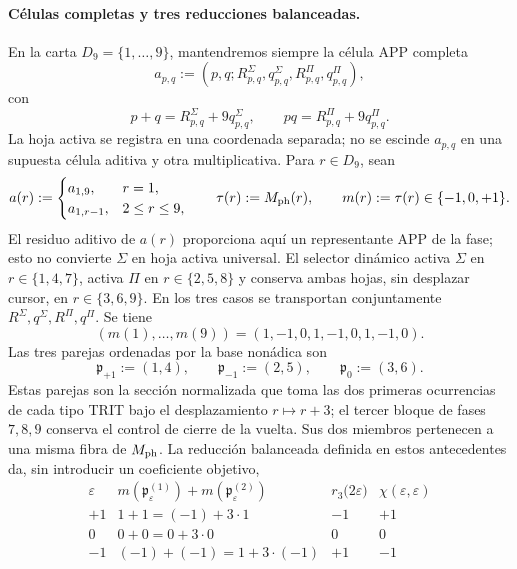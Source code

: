 \paragraph{Células completas y tres reducciones balanceadas.}
En la carta \(D_9=\{1,\ldots,9\}\), mantendremos siempre la célula APP
completa
\[
 a_{p,q}:=(p,q;R^\Sigma_{p,q},q^\Sigma_{p,q},
                 R^\Pi_{p,q},q^\Pi_{p,q}),
\]
con
\[
 p+q=R^\Sigma_{p,q}+9q^\Sigma_{p,q},\qquad
 pq=R^\Pi_{p,q}+9q^\Pi_{p,q}.
\]
La hoja activa se registra en una coordenada separada; no se escinde
\(a_{p,q}\) en una supuesta célula aditiva y otra multiplicativa. Para
\(r\in D_9\), sean
\begin{equation}
 a(r):=
 \begin{cases}
  a_{1,9},&r=1,\\
  a_{1,r-1},&2\le r\le9,
 \end{cases}
 \qquad
 \tau(r):=M_{\rm ph}(r),
 \qquad
 m(r):=\tau(r)\in\{-1,0,+1\}.
 \label{hmtfg:eq:celula-completa-fase-ch}
\end{equation}
El residuo aditivo de \(a(r)\) proporciona aquí un representante APP de la
fase; esto no convierte \(\Sigma\) en hoja activa universal. El selector
dinámico activa \(\Sigma\) en \(r\in\{1,4,7\}\), activa \(\Pi\) en
\(r\in\{2,5,8\}\) y conserva ambas hojas, sin desplazar cursor, en
\(r\in\{3,6,9\}\). En los tres casos se transportan conjuntamente
\(R^\Sigma,q^\Sigma,R^\Pi,q^\Pi\). Se tiene
\[
 (m(1),\ldots,m(9))=(1,-1,0,1,-1,0,1,-1,0).
\]
Las tres parejas ordenadas por la base nonádica son
\begin{equation}
 \mathfrak p_{+1}:=(1,4),\qquad
 \mathfrak p_{-1}:=(2,5),\qquad
 \mathfrak p_{0}:=(3,6).
 \label{hmtfg:eq:tres-pares-internos-ch}
\end{equation}
Estas parejas son la sección normalizada que toma las dos primeras
ocurrencias de cada tipo TRIT bajo el desplazamiento \(r\mapsto r+3\); el
tercer bloque de fases \(7,8,9\) conserva el control de cierre de la vuelta.
Sus dos miembros pertenecen a una misma fibra de \(M_{\rm ph}\). La
reducción balanceada definida en estos antecedentes da, sin introducir un coeficiente
objetivo,
\begin{equation}
 \begin{array}{c|c|c|c}
 \varepsilon&m(\mathfrak p_\varepsilon^{(1)})
                  +m(\mathfrak p_\varepsilon^{(2)})
   &r_3\bigl(2\varepsilon\bigr)&
   \chi(\varepsilon,\varepsilon)\\ \hline
 +1&1+1=(-1)+3\cdot1&-1&+1\\
 0&0+0=0+3\cdot0&0&0\\
 -1&(-1)+(-1)=1+3\cdot(-1)&+1&-1
 \end{array}
 \label{hmtfg:eq:tres-carry-derivados-ch}
\end{equation}
